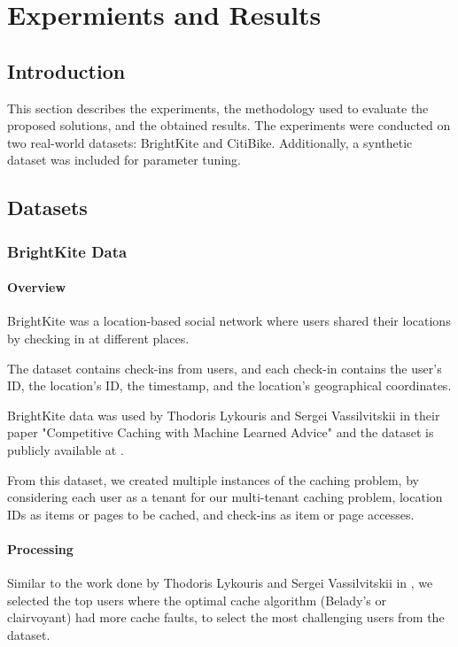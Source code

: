 \chapter{Expermients and Results}

\section{Introduction}

This section describes the experiments, the methodology used to evaluate the proposed
solutions, and the obtained results. The experiments were conducted on two real-world
datasets: BrightKite and CitiBike. Additionally, a synthetic dataset was included for
parameter tuning.

\section{Datasets}

\subsection{BrightKite Data}

\subsubsection{Overview}

BrightKite was a location-based social network where users shared their locations by checking in at 
different places.

The dataset contains check-ins from users, and each check-in contains the user's ID, the location's ID, 
the timestamp, and the location's geographical coordinates.

BrightKite data was used by Thodoris Lykouris and Sergei Vassilvitskii in their paper "Competitive 
Caching with Machine Learned Advice" \cite{datasets-reference} and the dataset is publicly available
at \cite{brightkite-data}.

From this dataset, we created multiple instances of the caching problem, by considering each user 
as a tenant for our multi-tenant caching problem, location IDs as items or pages to be cached, and 
check-ins as item or page accesses. 

\subsubsection{Processing}

Similar to the work done by Thodoris Lykouris and Sergei Vassilvitskii in \cite{datasets-reference},
we selected the top users where the optimal cache algorithm (Belady's or clairvoyant) had more cache 
faults, to select the most challenging users from the dataset.

